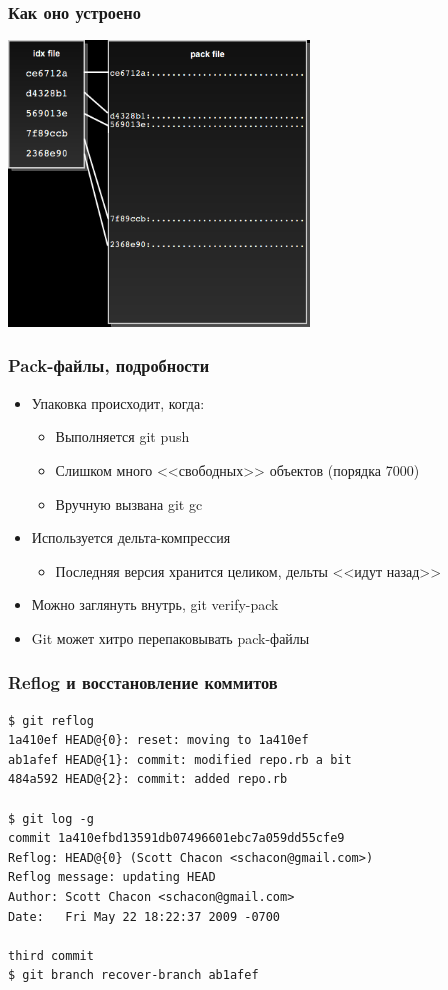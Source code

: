 \documentclass{../cscslides}
\begin{document}
    \begin{frame}
        \frametitle{Как оно устроено}
        \begin{center}
            \includegraphics[width=0.6\textwidth]{gitPackFilesBlack.png}
        \end{center}
    \end{frame}

    \begin{frame}
        \frametitle{Pack-файлы, подробности}
        \begin{itemize}
            \item Упаковка происходит, когда:
            \begin{itemize}
                \item Выполняется git push
                \item Слишком много <<свободных>> объектов (порядка 7000)
                \item Вручную вызвана git gc
            \end{itemize}
            \item Используется дельта-компрессия
            \begin{itemize}
                \item Последняя версия хранится целиком, дельты <<идут назад>>
            \end{itemize}
            \item Можно заглянуть внутрь, git verify-pack
            \item Git может хитро перепаковывать pack-файлы
        \end{itemize}
    \end{frame}

    \begin{frame}[fragile]
        \frametitle{Reflog и восстановление коммитов}
            \begin{verbatim}
$ git reflog
1a410ef HEAD@{0}: reset: moving to 1a410ef
ab1afef HEAD@{1}: commit: modified repo.rb a bit
484a592 HEAD@{2}: commit: added repo.rb

$ git log -g
commit 1a410efbd13591db07496601ebc7a059dd55cfe9
Reflog: HEAD@{0} (Scott Chacon <schacon@gmail.com>)
Reflog message: updating HEAD
Author: Scott Chacon <schacon@gmail.com>
Date:   Fri May 22 18:22:37 2009 -0700

third commit
$ git branch recover-branch ab1afef
            \end{verbatim}
    \end{frame}
\end{document}
